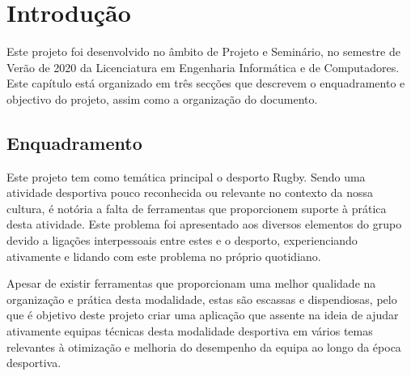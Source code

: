 %
%
%
\chapter{Introdução} \label{cap:intro}

Este projeto foi desenvolvido no âmbito de Projeto e Seminário, no semestre de Verão de 2020 da Licenciatura em Engenharia Informática e de Computadores. 
Este capítulo está organizado em três secções que descrevem o enquadramento e objectivo do projeto, assim como a organização do documento.


%
%
\section{Enquadramento\label{key}} \label{sec11}

%
Este projeto tem como temática principal o desporto Rugby. Sendo uma atividade desportiva pouco reconhecida ou relevante no contexto da nossa cultura, é notória a falta de ferramentas que proporcionem suporte à prática desta atividade. Este problema foi apresentado aos diversos elementos do grupo devido a ligações interpessoais entre estes e o desporto, experienciando ativamente e lidando com este problema no próprio quotidiano.

Apesar de existir ferramentas que proporcionam uma melhor qualidade na organização e prática desta modalidade, estas são escassas e dispendiosas, pelo que é objetivo deste projeto criar uma aplicação que assente na ideia de ajudar ativamente equipas técnicas desta modalidade desportiva em vários temas relevantes à otimização e melhoria do desempenho da equipa ao longo da época desportiva.



